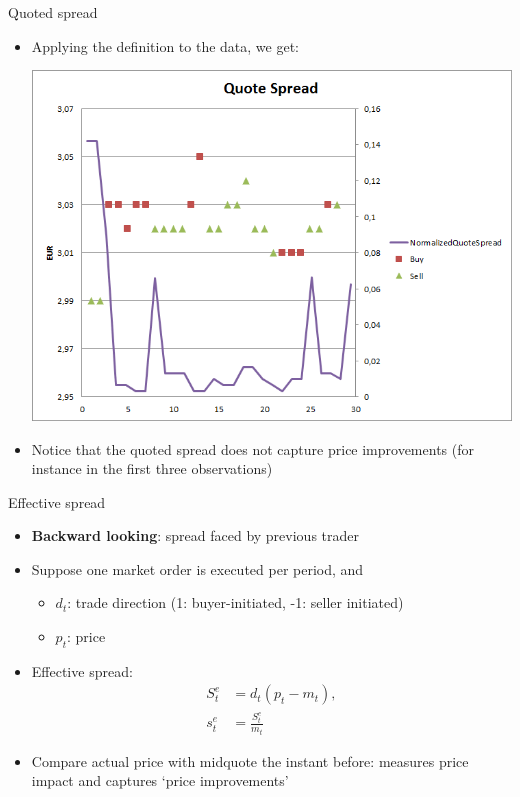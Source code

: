 \documentclass[english,10pt]{beamer}
\begin{document}
\begin{frame}{Quoted spread}
	\begin{itemize}
		\item Applying the definition to the data, we get:
		\begin{center}	
			\includegraphics[scale=0.35]{pics/L2_quotespread}
		\end{center}
		\item Notice that the quoted spread does not capture price improvements (for instance in the first three observations)
	\end{itemize}
\end{frame}


\begin{frame}{Effective spread}
	\begin{itemize}
		\item \textbf{Backward looking}: spread faced by previous trader
		\item Suppose one market order is executed per period, and
		\begin{itemize}
			\item $d_t$: trade direction (1: buyer-initiated, -1: seller initiated)
			\item $p_t$:  price
		\end{itemize}
		\item \alert{Effective spread}: 
		\begin{align*}
		S^e_t & = d_t(p_t-m_{t}), \\
		s^e_t & = \frac{S^e_t}{m_{t}}
		\end{align*}
		\item Compare actual price with midquote the instant before: measures price impact and captures `price improvements'
	\end{itemize}
\end{frame}
\end{document}
